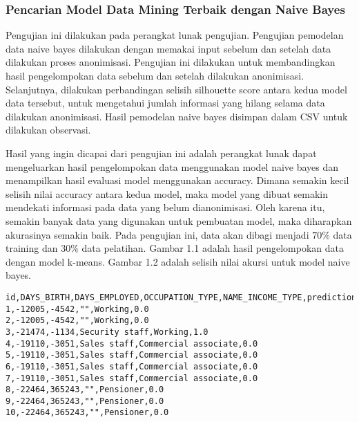 \subsubsection{Pencarian Model Data Mining Terbaik dengan Naive Bayes}

Pengujian ini dilakukan pada perangkat lunak pengujian. Pengujian pemodelan data naive bayes dilakukan dengan memakai input sebelum dan setelah data dilakukan proses anonimisasi. Pengujian ini dilakukan untuk membandingkan hasil pengelompokan data  sebelum dan setelah dilakukan anonimisasi. Selanjutnya, dilakukan perbandingan selisih silhouette score antara kedua model data tersebut, untuk mengetahui jumlah informasi yang hilang selama data dilakukan anonimisasi. Hasil pemodelan naive bayes disimpan dalam CSV untuk dilakukan observasi.

Hasil yang ingin dicapai dari pengujian ini adalah perangkat lunak dapat mengeluarkan hasil pengelompokan data menggunakan model naive bayes dan menampilkan hasil evaluasi model menggunakan accuracy. Dimana semakin kecil  selisih nilai accuracy antara kedua model, maka model yang dibuat semakin mendekati informasi pada data yang belum dianonimisasi. Oleh karena itu, semakin banyak data yang digunakan untuk pembuatan model, maka diharapkan akurasinya semakin baik. Pada pengujian ini, data akan dibagi menjadi $70\%$ data training dan $30\%$ data pelatihan. Gambar 1.1 adalah hasil pengelompokan data dengan model k-means. Gambar 1.2 adalah selisih nilai akursi untuk model naive bayes.

\newpage
\begin{lstlisting}[basicstyle=\ttfamily, frame=single,
	columns=fullflexible, keepspaces=true, breaklines=true, label=lst:fungsional_naivebayes1, caption=Hasil Klasifikasi Naive Bayes Sebelum Anonimisasi]
id,DAYS_BIRTH,DAYS_EMPLOYED,OCCUPATION_TYPE,NAME_INCOME_TYPE,prediction
1,-12005,-4542,"",Working,0.0
2,-12005,-4542,"",Working,0.0
3,-21474,-1134,Security staff,Working,1.0
4,-19110,-3051,Sales staff,Commercial associate,0.0
5,-19110,-3051,Sales staff,Commercial associate,0.0
6,-19110,-3051,Sales staff,Commercial associate,0.0
7,-19110,-3051,Sales staff,Commercial associate,0.0
8,-22464,365243,"",Pensioner,0.0
9,-22464,365243,"",Pensioner,0.0
10,-22464,365243,"",Pensioner,0.0
\end{lstlisting}

